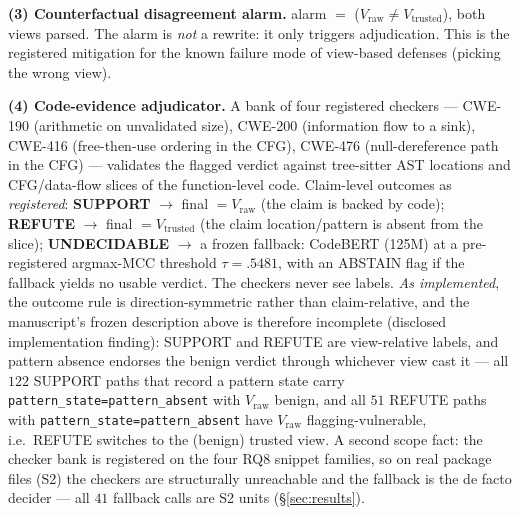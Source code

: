 \documentclass[sigconf,nonacm]{acmart}
\begin{document}
\textbf{(3) Counterfactual disagreement alarm.} alarm $=$ ($V_{\mathrm{raw}}
\ne V_{\mathrm{trusted}}$), both views parsed. The alarm is \emph{not} a
rewrite: it only triggers adjudication. This is the registered mitigation
for the known failure mode of view-based defenses (picking the wrong view).

\textbf{(4) Code-evidence adjudicator.} A bank of four registered checkers
--- CWE-190 (arithmetic on unvalidated size), CWE-200 (information flow to
a sink), CWE-416 (free-then-use ordering in the CFG), CWE-476
(null-dereference path in the CFG) --- validates the flagged verdict
against tree-sitter AST locations and CFG/data-flow slices of the
function-level code. Claim-level outcomes as \emph{registered}:
\textbf{SUPPORT} $\to$ final $= V_{\mathrm{raw}}$ (the claim is backed by
code); \textbf{REFUTE} $\to$ final $= V_{\mathrm{trusted}}$ (the claim
location/pattern is absent from the slice); \textbf{UNDECIDABLE} $\to$ a
frozen fallback: CodeBERT (125M) \cite{feng2020codebert} at a
pre-registered argmax-MCC threshold $\tau{=}.5481$, with an ABSTAIN flag
if the fallback yields no usable verdict. The checkers never see labels.
\emph{As implemented}, the outcome rule is direction-symmetric rather than
claim-relative, and the manuscript's frozen description above is
therefore incomplete (disclosed implementation finding): SUPPORT and
REFUTE are view-relative labels, and pattern absence endorses the benign
verdict through whichever view cast it --- all $122$ SUPPORT paths that
record a pattern state carry
\texttt{pattern\_state=pattern\_absent} with $V_{\mathrm{raw}}$ benign,
and all $51$ REFUTE paths with
\texttt{pattern\_state=pattern\_absent} have $V_{\mathrm{raw}}$
flagging-vulnerable, i.e.\ REFUTE switches to the (benign) trusted view.
A second scope fact: the checker bank is registered on the four RQ8
snippet families, so on real package files (S2) the checkers are
structurally unreachable and the fallback is the de facto decider ---
all $41$ fallback calls are S2 units (\S\ref{sec:results}).
\end{document}

